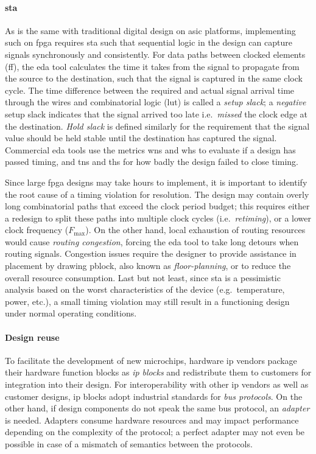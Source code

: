 \paragraph{\Ac{sta}} As is the same with traditional digital design on \ac{asic} platforms, implementing such on \ac{fpga} requires \ac{sta} such that sequential logic in the design can capture signals synchronously and consistently.  For data paths between clocked elements (\ac{ff}), the \ac{eda} tool calculates the time it takes from the signal to propagate from the source to the destination, such that the signal is captured in the same clock cycle.  The time difference between the required and actual signal arrival time through the wires and combinatorial logic (\ac{lut}) is called a \emph{setup slack}; a \emph{negative} setup slack indicates that the signal arrived too late i.e.\ \emph{missed} the clock edge at the destination.  \emph{Hold slack} is defined similarly for the requirement that the signal value should be held stable until the destination has captured the signal.  Commercial \ac{eda} tools use the metrics \ac{wns} and \ac{whs} to evaluate if a design has passed timing, and \ac{tns} and \ac{ths} for how badly the design failed to close timing.

Since large \ac{fpga} designs may take hours to implement, it is important to identify the root cause of a timing violation for resolution.  The design may contain overly long combinatorial paths that exceed the clock period budget; this requires either a redesign to split these paths into multiple clock cycles (i.e.\ \emph{retiming}), or a lower clock frequency ($F_\text{max}$).  On the other hand, local exhaustion of routing resources would cause \emph{routing congestion}, forcing the \ac{eda} tool to take long detours when routing signals.  Congestion issues require the designer to provide assistance in placement by drawing \ac{pblock}, also known as \emph{floor-planning}, or to reduce the overall resource consumption.  Last but not least, since \ac{sta} is a pessimistic analysis based on the worst characteristics of the device (e.g.\ temperature, power, etc.), a small timing violation may still result in a functioning design under normal operating conditions.

\paragraph{Design reuse} To facilitate the development of new microchips, hardware \ac{ip} vendors package their hardware function blocks as \emph{\ac{ip} blocks} and redistribute them to customers for integration into their design.  For interoperability with other \ac{ip} vendors as well as customer designs, \ac{ip} blocks adopt industrial standards for \emph{bus protocols}.  On the other hand, if design components do not speak the same bus protocol, an \emph{adapter} is needed.  Adapters consume hardware resources and may impact performance depending on the complexity of the protocol; a perfect adapter may not even be possible in case of a mismatch of semantics between the protocols.

